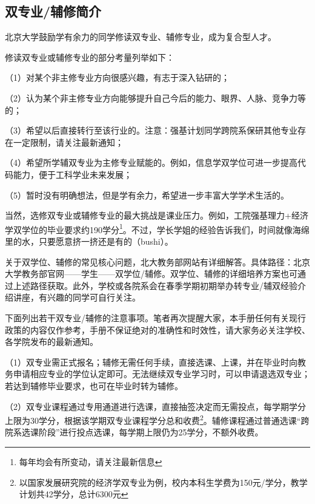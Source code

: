 \subsection{双专业/辅修简介}
北京大学鼓励学有余力的同学修读双专业、辅修专业，成为复合型人才。

\vspace{10pt}

修读双专业或辅修专业的部分考量列举如下：

（1）对某个非主修专业方向很感兴趣，有志于深入钻研的；

（2）认为某个非主修专业方向能够提升自己今后的能力、眼界、人脉、竞争力等的；

（3）希望以后直接转行至该行业的。注意：强基计划同学跨院系保研其他专业存在一定限制，请关注最新通知；

（4）希望所学辅双专业为主修专业赋能的。例如，信息学双学位可进一步提高代码能力，便于工科学业未来发展；

（5）暂时没有明确想法，但是学有余力，希望进一步丰富大学学术生活的。

\vspace{10pt}

当然，选修双专业或辅修专业的最大挑战是课业压力。例如，工院强基理力+经济学双学位的毕业要求约190学分\footnote{每年均会有所变动，请关注最新信息}。不过，学长学姐的经验告诉我们，时间就像海绵里的水，只要愿意挤一挤还是有的（bushi）。

\vspace{10pt}

关于双学位、辅修的常见核心问题，北大教务部网站有详细解答。具体路径：北京大学教务部官网——学生——双学位/辅修。双学位、辅修的详细培养方案也可通过上述路径获取。此外，学校或各院系会在春季学期初期举办转专业/辅双经验介绍讲座，有兴趣的同学可自行关注。

\vspace{10pt}

下面列出若干双专业/辅修的注意事项。笔者再次提醒大家，本手册任何有关现行政策的内容仅作参考，手册不保证绝对的准确性和时效性，请大家务必关注学校、各学院发布的最新通知。

\vspace{10pt}

（1）双专业需正式报名；辅修无需任何手续，直接选课、上课，并在毕业时向教务申请相应专业的学位认定即可。无法继续双专业学习时，可以申请退选双专业；若达到辅修毕业要求，也可在毕业时转为辅修。

\vspace{10pt}

（2）双专业课程通过专用通道进行选课，直接抽签决定而无需投点，每学期学分上限为30学分，根据该学期双专业课程学分总和收费\footnote{以国家发展研究院的经济学双专业为例，校内本科生学费为150元/学分，教学计划共42学分，总计6300元}。辅修课程通过普通选课“跨院系选课阶段”进行投点选课，每学期上限仍为25学分，不额外收费。

